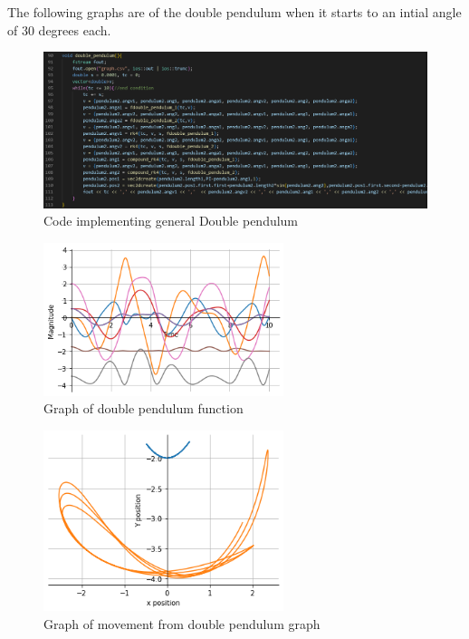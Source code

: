 \documentclass[12pt, a2paper]{article}
\begin{document}
The following graphs are of the double pendulum when it starts to an intial angle of 30 degrees each.
\begin{figure}[h]
\center
\includegraphics[width=1\textwidth]{Double pendulum function}
\caption{Code implementing general Double pendulum}
\label{fig 7}
\end{figure}
\pagebreak
\begin{figure}[h]
\center
\includegraphics[width=0.625\textwidth]{Double pendulum graph}
\caption{Graph of double pendulum function}
\label{Graph 5}
\end{figure}
\begin{figure}[h]
\center
\includegraphics[width=0.625\textwidth]{Double pendulum movement graph}
\caption{Graph of movement from double pendulum graph}
\label{Graph 6}
\end{figure}
\pagebreak
\end{document}
